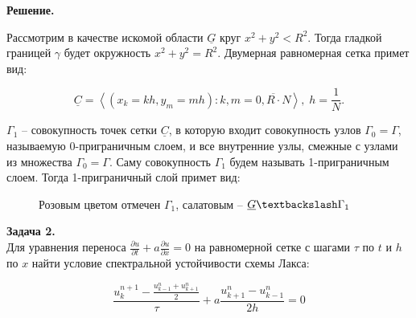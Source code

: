 \documentclass[14pt,a4paper]{scrartcl}
\begin{document}
	\textbf{Решение.}
	
	Рассмотрим в качестве искомой области $\underline{G}$ круг $x^2 + y^2 < R^2$. Тогда гладкой границей $\gamma$ будет окружность $x^2 + y^2 = R^2$. Двумерная равномерная сетка примет вид:
	
	\begin{equation*}
		\underline{C} = \left\langle (x_k = kh, y_m = mh): k,m = \overline{0,R\cdot N} \right\rangle, \; h = \frac{1}{N}.
	\end{equation*}
	
	
	$\Gamma_1$ -- совокупность точек сетки $\underline{C}$, в которую входит совокупность узлов $\Gamma_0 = \Gamma$, называемую 0-приграничным слоем, и все внутренние узлы, смежные с узлами из множества $\Gamma_0 = \Gamma$. Саму совокупность $\Gamma_1$ будем называть 1-приграничным слоем. Тогда 1-приграничный слой примет вид:
	
	\begin{figure}[H]
		\begin{minipage}[h]{1\linewidth}
			\caption{Розовым цветом отмечен $\Gamma_1$, салатовым -- $\underline{G} \textbackslash \Gamma_1$}  
		\end{minipage}
	\end{figure}
	
	\newpage
	
	\textbf{Задача 2.}\\
	Для уравнения переноса $\frac{\partial u}{\partial t} + a \frac{\partial u}{\partial x} = 0$ на равномерной сетке с шагами $\tau$ по $t$ и $h$ по $x$ найти условие спектральной устойчивости схемы Лакса:
	
	\begin{equation*}
		\frac{u_{k}^{n+1}-\frac{u_{k-1}^{n}+u_{k+1}^{n}}{2}}{\tau}+a \frac{u_{k+1}^{n}-u_{k-1}^{n}}{2 h}=0
	\end{equation*}
	
\end{document}
